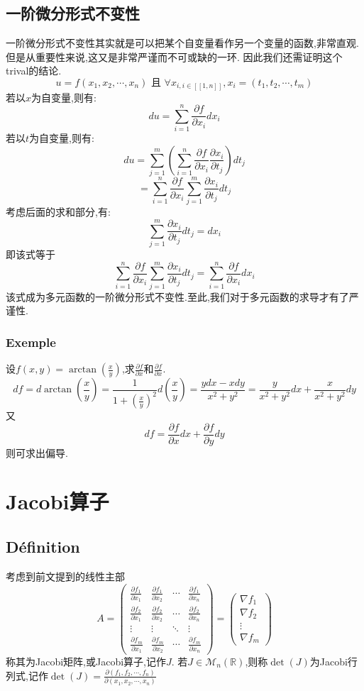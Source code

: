 \documentclass[12pt, a4paper, oneside]{ctexbook}
\begin{document}
    \subsection{一阶微分形式不变性}
    一阶微分形式不变性其实就是可以把某个自变量看作另一个变量的函数,非常直观.但是从重要性来说,这又是非常严谨而不可或缺的一环.
    因此我们还需证明这个trival的结论.
    $$
    u=f(x_1,x_2,\cdots,x_n) \text{ 且 }\forall x_{i,i\in [\![1,n]\!]}, x_i=(t_1,t_2,\cdots,t_m)
    $$
    若以$x$为自变量,则有:
    $$
      du=\sum_{i=1}^{n}\frac{\partial f}{\partial x_i}dx_i
    $$
    若以$t$为自变量,则有:
    $$
      du=\sum_{j=1}^{m}(\sum_{i=1}^{n}\frac{\partial f}{\partial x_i}\frac{\partial x_i}{\partial t_j})dt_j
    $$
    $$
      =\sum_{i=1}^{n}\frac{\partial f}{\partial x_i}\sum_{j=1}^{m}\frac{\partial x_i}{\partial t_j}dt_j
    $$
    考虑后面的求和部分,有:
    $$
    \sum_{j=1}^{m}\frac{\partial x_i}{\partial t_j}dt_j=dx_i
    $$
    即该式等于
    $$
    \sum_{i=1}^{n}\frac{\partial f}{\partial x_i}\sum_{j=1}^{m}\frac{\partial x_i}{\partial t_j}dt_j = \sum_{i=1}^{n}\frac{\partial f}{\partial x_i}dx_i
    $$
    该式成为多元函数的一阶微分形式不变性.至此,我们对于多元函数的求导才有了严谨性.
    \subsubsection{Exemple}
    设$f(x,y)=\arctan(\frac{x}{y})$,求$\frac{\partial f}{\partial x}$和$\frac{\partial f}{\partial x}$.\\


    $$df=d \arctan(\frac{x}{y})=\frac{1}{1+(\frac{x}{y})^2}d(\frac{x}{y})=\frac{ydx-xdy}{x^2+y^2}=\frac{y}{x^2+y^2}dx+\frac{x}{x^2+y^2}dy$$
    又
    $$df=\frac{\partial f}{\partial x}dx+ \frac{\partial f}{\partial y}dy$$
    则可求出偏导.
    \section{Jacobi算子}
    \subsection{Définition}
    考虑到前文提到的线性主部
    $$
     A=\begin{pmatrix}
      \frac{\partial f_1}{\partial x_1}&\frac{\partial f_1}{\partial x_2}  &\cdots  &\frac{\partial f_1}{\partial x_n} \\
      \frac{\partial f_2}{\partial x_1}&\frac{\partial f_2}{\partial x_2}  & \cdots & \frac{\partial f_2}{\partial x_n}\\ 
      \vdots& \vdots & \ddots  & \vdots\\
      \frac{\partial f_m}{\partial x_1}&\frac{\partial f_m}{\partial x_2} &\cdots & \frac{\partial f_m}{\partial x_n} 
     \end{pmatrix}
     =\begin{pmatrix}
      \nabla f_1\\
      \nabla f_2\\
      \vdots\\
      \nabla f_m
     \end{pmatrix}
    $$
    称其为Jacobi矩阵,或Jacobi算子,记作$J$.
    若$J\in\mathcal{M}_n(\mathbb{R}) $,则称$\det(J)$为Jacobi行列式,记作$\det(J)=\frac{\partial(f_1,f_2,\cdots,f_n)}{\partial(x_1,x_2,\cdots,x_n)}$
\end{document}
